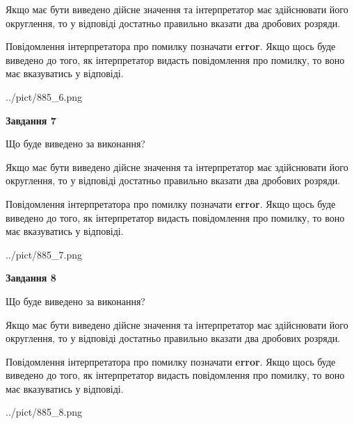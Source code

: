 \documentclass[12pt, ukrainian]{article}
\begin{document}
{\begin {Large}
Якщо має бути виведено дійсне значення та інтерпретатор має здійснювати його округлення, 
то у відповіді достатньо правильно вказати два дробових розряди.

Повідомлення інтерпретатора про помилку позначати \textbf{error}.
Якщо щось буде виведено до того, як інтерпретатор видасть повідомлення про помилку, 
то воно має вказуватись у відповіді. \par

\begin{center}
	{../pict/885_6.png}
\end{center}
\newpage

{\begin {center}\textbf{Завдання 7}\end {center}}\par
Що буде виведено за виконання? \par

Якщо має бути виведено дійсне значення та інтерпретатор має здійснювати його округлення, 
то у відповіді достатньо правильно вказати два дробових розряди.

Повідомлення інтерпретатора про помилку позначати \textbf{error}.
Якщо щось буде виведено до того, як інтерпретатор видасть повідомлення про помилку, 
то воно має вказуватись у відповіді. \par

\begin{center}
	{../pict/885_7.png}
\end{center}
\newpage

{\begin {center}\textbf{Завдання 8}\end {center}}\par
Що буде виведено за виконання? \par

Якщо має бути виведено дійсне значення та інтерпретатор має здійснювати його округлення, 
то у відповіді достатньо правильно вказати два дробових розряди.

Повідомлення інтерпретатора про помилку позначати \textbf{error}.
Якщо щось буде виведено до того, як інтерпретатор видасть повідомлення про помилку, 
то воно має вказуватись у відповіді. \par

\begin{center}
	{../pict/885_8.png}
\end{center}
\newpage


\end{Large}}
\end{document}
